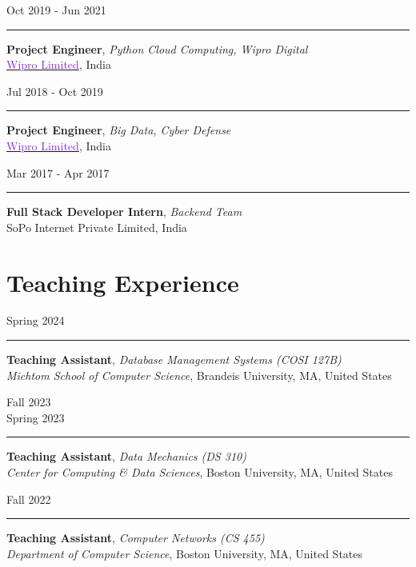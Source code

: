 \documentclass[10pt,a4paper,calibri]{moderncv}
\newcommand{\beforesection}{\vspace{-0.5em}}
\newcommand{\mediumspace}{\vspace{0.5em}}
\newcommand{\workexperience}[2]{
  \noindent
  \begin{minipage}[c]{0.20\textwidth}
    \begin{flushright}
      #1      
    \end{flushright}
  \end{minipage}%
  \hspace{0.01\textwidth}
  \begin{minipage}[c]{0.02\textwidth}
    \textcolor{lightgray}{\rule{1pt}{0.7cm}}
  \end{minipage}%
  \begin{minipage}[c]{0.80\textwidth}
    \raggedright{
    #2
    }
  \end{minipage}%
}
\newcommand{\teachingexperience}[2]{
\noindent
  \begin{minipage}[c]{0.12\textwidth}
    \begin{center}
        #1
    \end{center}
  \end{minipage}%
  \hspace{0.01\textwidth}
  \begin{minipage}[c]{0.02\textwidth}
    \textcolor{lightgray}{\rule{1pt}{0.7cm}}
  \end{minipage}%
  \begin{minipage}[c]{0.86\textwidth}
    \raggedright{
      \vspace{0.001cm}
      #2
      \vspace{0.001cm}
    }  
  \end{minipage}%
}
\begin{document}
\mediumspace

\workexperience{Oct 2019 \-- Jun 2021}{
  \textbf{Project Engineer}, \textit{Python Cloud Computing, Wipro Digital}\\
    \href{https://www.wipro.com/}{\textcolor{blueviolet}{Wipro Limited}}, India\\
}

\mediumspace

\workexperience{Jul 2018 \-- Oct 2019}{
  \textbf{Project Engineer}, \textit{Big Data, Cyber Defense}\\
    \href{https://www.wipro.com/}{\textcolor{blueviolet}{Wipro Limited}}, India\\
}

\mediumspace

\workexperience{Mar 2017 \-- Apr 2017}{
  \textbf{Full Stack Developer Intern}, \textit{Backend Team}\\
    SoPo Internet Private Limited, India\\
}

\beforesection

\section{Teaching Experience}
\teachingexperience{\hfill Spring 2024}{
    \textbf{Teaching Assistant}, \textit{Database Management Systems (COSI 127B)}\\
    \textit{Michtom School of Computer Science}, Brandeis University, MA, United States\\
}

\mediumspace

\teachingexperience{\hfill Fall 2023\\ \hfill Spring 2023}{
    \textbf{Teaching Assistant}, \textit{Data Mechanics (DS 310)}\\
    \textit{Center for Computing \& Data Sciences}, Boston University, MA, United States\\
}

\mediumspace

\teachingexperience{\hfill Fall 2022}{
  \textbf{Teaching Assistant}, \textit{Computer Networks (CS 455)}\\
  \textit{Department of Computer Science}, Boston University, MA, United States\\
}

\beforesection
\end{document}
